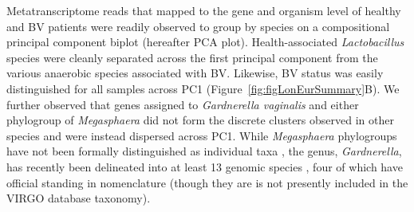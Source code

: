 \documentclass[sn-mathphys,Numbered]{sn-jnl}%
\begin{document}
Metatranscriptome reads that mapped to the gene and organism level of healthy and BV patients were readily observed to group by species on a compositional principal component biplot \cite{aitchison2002biplots} (hereafter PCA plot). Health-associated \textit{Lactobacillus} species were cleanly separated across the first principal component from the various anaerobic species associated with BV. Likewise, BV status was easily distinguished for all samples across PC1 (Figure~\ref{fig:figLonEurSummary}B). We further observed that genes assigned to \textit{Gardnerella vaginalis} and either phylogroup of \textit{Megasphaera} did not form the discrete clusters observed in other species and were instead dispersed across PC1. While \textit{Megasphaera} phylogroups have not been formally distinguished as individual taxa \citep{glascock_unique_2021}, the genus, \textit{Gardnerella}, has recently been delineated into at least 13 genomic species \citep{vaneechoutte_emended_2019}, four of which have official standing in nomenclature (though they are is not presently included in the VIRGO database taxonomy).
\end{document}
